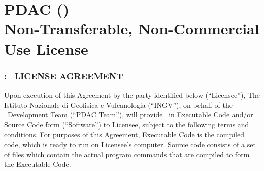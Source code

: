 
\thispagestyle{empty}

\section*{PDAC (\PDACNAME )\\
Non-Transferable, Non-Commercial Use License}

\subsubsection*{\PDAC: \PDACNAME\ LICENSE AGREEMENT}

Upon execution of this Agreement by the party identiﬁed below (“Licensee”), The Istituto Nazionale di Geoﬁsica e Vulcanologia (“INGV”), on behalf of the \PDAC\ Development Team (“PDAC Team”), will provide \PDAC\ in Executable Code and/or Source Code form (“Software”) to Licensee, subject to the following terms and conditions. For purposes of this Agreement, Executable Code is the compiled code, which is ready to run on Licensee’s computer. Source code consists of a set of files which contain the actual program commands that are compiled to form the Executable Code. 


